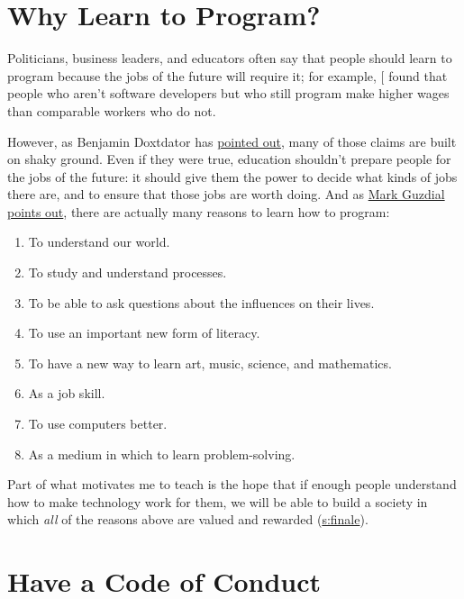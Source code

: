 \section{Why Learn to Program?}\label{s:intro-why}

Politicians, business leaders, and educators often say that people
should learn to program because the jobs of the future will require it;
for example, {[}\protect[\hyperlink{b:Scaf2017}{Scaf2017}]{]} found that people who aren't software
developers but who still program make higher wages than comparable
workers who do not.

However, as Benjamin Doxtdator has \href{http://www.longviewoneducation.org/field-guide-jobs-dont-exist-yet/}{pointed out}, many
of those claims are built on shaky ground. Even if they were true,
education shouldn't prepare people for the jobs of the future: it
should give them the power to decide what kinds of jobs there are, and
to ensure that those jobs are worth doing. And as \href{https://computinged.wordpress.com/2017/10/18/why-should-we-teach-programming-hint-its-not-to-learn-problem-solving/}{Mark Guzdial points
out}, there are actually many reasons to
learn how to program:

\begin{enumerate}
\item
  To understand our world.
\item
  To study and understand processes.
\item
  To be able to ask questions about the influences on their lives.
\item
  To use an important new form of literacy.
\item
  To have a new way to learn art, music, science, and mathematics.
\item
  As a job skill.
\item
  To use computers better.
\item
  As a medium in which to learn problem-solving.
\end{enumerate}

Part of what motivates me to teach is the hope that if enough people
understand how to make technology work for them, we will be able to
build a society in which \emph{all} of the reasons above are valued and
rewarded (\protect\hyperlink{CHAPTER}{s:finale}).

\section{Have a Code of Conduct}\label{s:intro-code-of-conduct}

